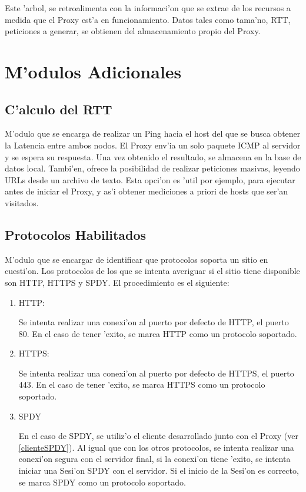 Este 'arbol, se retroalimenta con la informaci'on que se extrae de los recursos a medida que el Proxy est'a en funcionamiento. Datos tales como tama'no, RTT, peticiones a generar, se obtienen del almacenamiento propio del Proxy. 

\section{M'odulos Adicionales}

\subsection{C'alculo del RTT}
\label{measureRTT}
M'odulo que se encarga de realizar un Ping hacia el host del que se busca obtener la Latencia entre ambos nodos. El Proxy env'ia un solo paquete ICMP al servidor y se espera su respuesta. Una vez obtenido el resultado, se almacena en la base de datos local.
Tambi'en, ofrece la posibilidad de realizar peticiones masivas, leyendo URLs desde un archivo de texto. Esta opci'on es 'util por ejemplo, para ejecutar antes de iniciar el Proxy, y as'i obtener mediciones a priori de hosts que ser'an visitados.

\subsection{Protocolos Habilitados}

M'odulo que se encargar de identificar que protocolos soporta un sitio en cuesti'on. Los protocolos de los que se intenta averiguar si el sitio tiene disponible son HTTP, HTTPS y SPDY. El procedimiento es el siguiente: 
\begin{enumerate}
\item HTTP:

Se intenta realizar una conexi'on al puerto por defecto de HTTP, el puerto 80. En el caso de tener 'exito, se marca HTTP como un protocolo soportado.
\item HTTPS:

Se intenta realizar una conexi'on al puerto por defecto de HTTPS, el puerto 443. En el caso de tener 'exito, se marca HTTPS como un protocolo soportado.
\item SPDY

En el caso de SPDY, se utiliz'o el cliente desarrollado junto con el Proxy (ver \ref{clienteSPDY}). Al igual que con los otros protocolos, se intenta realizar una conexi'on segura con el servidor final, si la conexi'on tiene 'exito, se intenta iniciar una Sesi'on SPDY con el servidor. Si el inicio de la Sesi'on es correcto, se marca SPDY como un protocolo soportado.
\end{enumerate}

